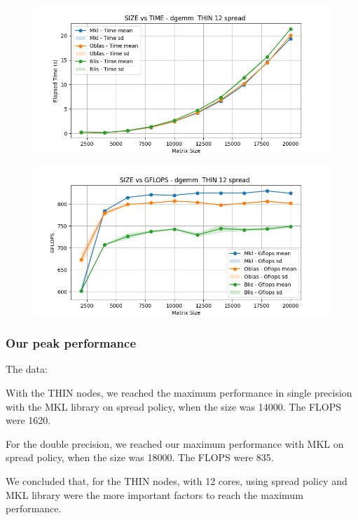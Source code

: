 \documentclass[12pt, titlepage]{report}
\begin{document}
\begin{figure}[H]
    \centering
    \includegraphics[width=\textwidth]{THIN 12/dgemm__THIN_12_spread_time.png}
\end{figure}

\begin{figure}[H]
    \centering
    \includegraphics[width=\textwidth]{THIN 12/dgemm__THIN_12_spread_gflops.png}
\end{figure}



\subsubsection{Our peak performance}
The data:

With the THIN nodes, we reached the maximum performance in single precision with the MKL library on spread policy, when the size was 14000. The FLOPS were 1620.

For the double precision, we reached our maximum performance with MKL on spread policy, when the size was 18000. The FLOPS were 835. 

We concluded that, for the THIN nodes, with 12 cores, using spread policy and MKL library were the more important factors to reach the maximum performance. 
\end{document}
